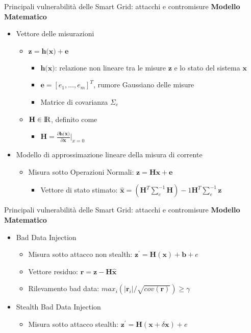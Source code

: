\begin{frame}{Principali vulnerabilità delle Smart Grid: attacchi e contromisure}
\textbf{Modello Matematico}
\begin{itemize}[<+- | alert@+>]
	\item Vettore delle misurazioni
	\begin{itemize}
		\item $\textbf{z} = \textbf{h(x)} + \textbf{e}$
		\begin{itemize}
			\item $\textbf{h(x)}$: relazione non lineare tra le misure $\textbf{z}$ e lo stato del sistema $\textbf{x}$
			\item $\textbf{e} = [e_1, \ldots, e_m]^T$, rumore Gaussiano delle misure
			\item Matrice di covarianza $\Sigma_e$
		\end{itemize}
	\item $\textbf{H} \in {\rm I\!R}$, definito come
	\begin{itemize}
		\item $\textbf{H}=\frac{\partial\textbf{h(x)}}{\partial\textbf{x}}|_{x=0}$
	\end{itemize}
	\end{itemize}
	\item Modello di approssimazione lineare della misura di corrente
	\begin{itemize}
		\item Misura sotto Operazioni Normali: $\textbf{z} =  \textbf{Hx} + \textbf{e}$
		\begin{itemize}
			\item Vettore di stato stimato: $\widehat{\textbf{x}} = (\textbf{H}^T\sum_e^{-1}\textbf{H})-1\textbf{H}^T\sum_e^{-1}\textbf{z}$
		\end{itemize}
	\end{itemize}
	\end{itemize}
\end{frame}

\begin{frame}{Principali vulnerabilità delle Smart Grid: attacchi e contromisure}
	\textbf{Modello Matematico}
	\begin{itemize}
	\item Bad Data Injection
	\begin{itemize}
		\item Misura sotto attacco non stealth: $\textbf{z}^\prime = \textbf{H}(\textbf{x}) + \textbf{b} + e$
		\item Vettore residuo: $\textbf{r} = \textbf{z} - \textbf{H}\widehat{\textbf{x}}$
		\item Rilevamento bad data: $max_i(|\textbf{r}_i|/\sqrt{cov(\textbf{r})}) \geq \gamma$
	\end{itemize}
	\item Stealth Bad Data Injection
	\begin{itemize}
		\item Misura sotto attacco stealth: $\textbf{z}^\prime = \textbf{H}(\textbf{x} + \delta\textbf{x}) + e$
	\end{itemize}
\end{itemize}
\end{frame}

